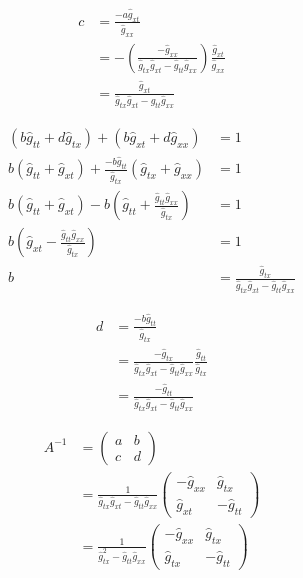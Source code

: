 \documentclass[english]{article}
\begin{document}
\begin{align*}
c & =\frac{-a\hat{g}_{xt}}{\hat{g}_{xx}}\\
 & =-\left(\frac{-\hat{g}_{xx}}{\hat{g}_{tx}\hat{g}_{xt}-\hat{g}_{tt}\hat{g}_{xx}}\right)\frac{\hat{g}_{xt}}{\hat{g}_{xx}}\\
 & =\frac{\hat{g}_{xt}}{\hat{g}_{tx}\hat{g}_{xt}-\hat{g}_{tt}\hat{g}_{xx}}
\end{align*}

\begin{align*}
\left(b\hat{g}_{tt}+d\hat{g}_{tx}\right)+\left(b\hat{g}_{xt}+d\hat{g}_{xx}\right) & =1\\
b\left(\hat{g}_{tt}+\hat{g}_{xt}\right)+\frac{-b\hat{g}_{tt}}{\hat{g}_{tx}}\left(\hat{g}_{tx}+\hat{g}_{xx}\right) & =1\\
b\left(\hat{g}_{tt}+\hat{g}_{xt}\right)-b\left(\hat{g}_{tt}+\frac{\hat{g}_{tt}\hat{g}_{xx}}{\hat{g}_{tx}}\right) & =1\\
b\left(\hat{g}_{xt}-\frac{\hat{g}_{tt}\hat{g}_{xx}}{\hat{g}_{tx}}\right) & =1\\
b & =\frac{\hat{g}_{tx}}{\hat{g}_{tx}\hat{g}_{xt}-\hat{g}_{tt}\hat{g}_{xx}}
\end{align*}

\begin{align*}
d & =\frac{-b\hat{g}_{tt}}{\hat{g}_{tx}}\\
 & =\frac{-\hat{g}_{tx}}{\hat{g}_{tx}\hat{g}_{xt}-\hat{g}_{tt}\hat{g}_{xx}}\frac{\hat{g}_{tt}}{\hat{g}_{tx}}\\
 & =\frac{-\hat{g}_{tt}}{\hat{g}_{tx}\hat{g}_{xt}-\hat{g}_{tt}\hat{g}_{xx}}
\end{align*}

\begin{align*}
A^{-1} & =\begin{pmatrix}a & b\\
c & d
\end{pmatrix}\\
 & =\frac{1}{\hat{g}_{tx}\hat{g}_{xt}-\hat{g}_{tt}\hat{g}_{xx}}\begin{pmatrix}-\hat{g}_{xx} & \hat{g}_{tx}\\
\hat{g}_{xt} & -\hat{g}_{tt}
\end{pmatrix}\\
 & =\frac{1}{\hat{g}^{2}_{tx}-\hat{g}_{tt}\hat{g}_{xx}}\begin{pmatrix}-\hat{g}_{xx} & \hat{g}_{tx}\\
\hat{g}_{tx} & -\hat{g}_{tt}
\end{pmatrix}
\end{align*}
\end{document}
